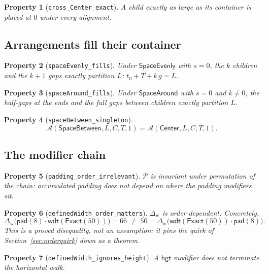 \documentclass[11pt,a4paper]{article}
\newcommand{\Exact}{\mathsf{Exact}}
\newcommand{\pad}{\mathsf{pad}}
\newcommand{\wdt}{\mathsf{wdt}}
\newcommand{\hgt}{\mathsf{hgt}}
\newcommand{\Center}{\mathsf{Center}}
\newcommand{\SBetween}{\mathsf{SpaceBetween}}
\newcommand{\SEvenly}{\mathsf{SpaceEvenly}}
\newcommand{\SAround}{\mathsf{SpaceAround}}
\newcommand{\Aa}{\mathcal{A}}          %
\newcommand{\Pp}{\mathcal{P}}          %
\newcommand{\Dw}{\Delta_{\mathrm{w}}}
\theoremstyle{definition}
\theoremstyle{plain}
\newtheorem{property}{Property}[section]
\theoremstyle{remark}
\begin{document}
\begin{property}[\texttt{cross\_Center\_exact}]
A child exactly as large as its container is placed at $0$ under every
alignment.
\end{property}

\subsection{Arrangements fill their container}

\begin{property}[\texttt{spaceEvenly\_fills}]
Under $\SEvenly$ with $s = 0$, the $k$ children and the $k+1$ gaps exactly
partition $L$: $t_0 + T + k\,g = L$.
\end{property}

\begin{property}[\texttt{spaceAround\_fills}]
Under $\SAround$ with $s = 0$ and $k \neq 0$, the half-gaps at the ends and the
full gaps between children exactly partition $L$.
\end{property}

\begin{property}[\texttt{spaceBetween\_singleton}]
\[
  \Aa(\SBetween, L, C, T, 1) = \Aa(\Center, L, C, T, 1).
\]
\end{property}

\subsection{The modifier chain}

\begin{property}[\texttt{padding\_order\_irrelevant}]
$\Pp$ is invariant under permutation of the chain: accumulated padding does not
depend on where the padding modifiers sit.
\end{property}

\begin{property}[\texttt{definedWidth\_order\_matters}]
$\Dw$ \emph{is} order-dependent. Concretely,
\[
  \Dw\bigl(\pad(8)\cdot\wdt(\Exact(50))\bigr) = 66
  \;\neq\; 50 = \Dw\bigl(\wdt(\Exact(50))\cdot\pad(8)\bigr).
\]
This is a proved disequality, not an assumption: it pins the quirk of
Section~\ref{sec:orderquirk} down as a theorem.
\end{property}

\begin{property}[\texttt{definedWidth\_ignores\_height}]
A $\hgt$ modifier does not terminate the horizontal walk.
\end{property}
\end{document}
